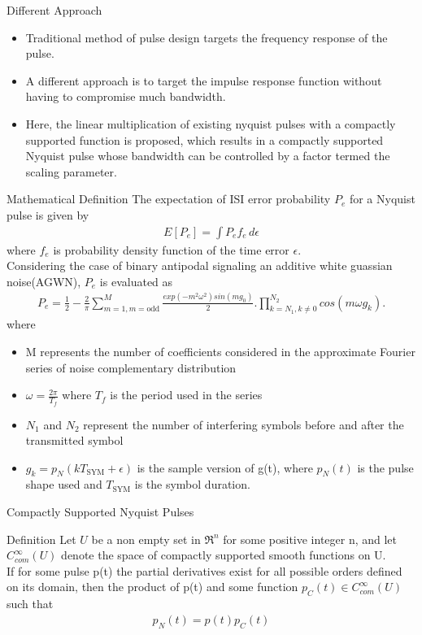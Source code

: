 \documentclass[10pt]{beamer}
\begin{document}
\begin{frame}{Different Approach}

\begin{itemize}
\item Traditional method of pulse design targets the frequency response of the pulse.
\item A different approach is to target the impulse response function without having to compromise much bandwidth.
\item Here, the linear multiplication of existing nyquist pulses with a compactly supported function is proposed, which results in a compactly supported Nyquist pulse whose bandwidth can be controlled by a factor termed the scaling parameter. 
\end{itemize}

\end{frame}
\begin{frame}{Mathematical Definition}
The expectation of ISI error probability $P_{e}$ for a Nyquist pulse is given by
\begin{align}
E[P_{e}]=\int P_{e}f_{e} \,d\epsilon
\end{align}
where $f_{e}$ is probability density function of the time
error $\epsilon$.\\
Considering the case of binary antipodal signaling an additive white guassian noise(AGWN), $P_{e}$ is evaluated as
\begin{align}
P_{e}= \frac{1}{2}-\frac{2}{\pi}\sum_{m=1,m=\text{odd}}^{M}\frac{exp(-m^{2}\omega^{2})sin(mg_{0})}{2}.\prod_{k=N_{1},k\neq 0}^{N_{2}}cos(m\omega g_{k}).
\end{align}
where 
\begin{itemize}
\item M represents the number of coefficients considered in the approximate Fourier series of noise complementary distribution
\item $\omega=\frac{2\pi}{T_{f}}$ where $T_{f}$ is the period used in the series
\item $N_{1}$ and $N_{2}$ represent the number of interfering symbols before and after the transmitted symbol
\item $g_{k} = p_{N}(kT_{\text{SYM}} + \epsilon)$ is the sample version of g(t), where $p_{N}(t)$ is the pulse shape used and $T_{\text{SYM}}$ is the symbol duration.
\end{itemize}

\end{frame}
\begin{frame}{Compactly Supported Nyquist Pulses}
 \begin{block}{Definition}
 Let $\mathit{U}$ be a non empty set in $\mathfrak{R}^{n}$ for some positive integer n, and let $C_{com}^{\infty}(\mathit{U})$ denote the space of compactly supported smooth functions on U. \\
If for some pulse p(t) the partial derivatives exist for all possible orders defined on its domain, then the product of p(t) and some function $p_{C}(t) \in C_{com}^{\infty}(\mathit{U}) $
such that
\begin{align}
p_{N}(t) = p(t)p_{C}(t)  
\end{align}
 
 \end{block}
\end{frame}
\end{document}

